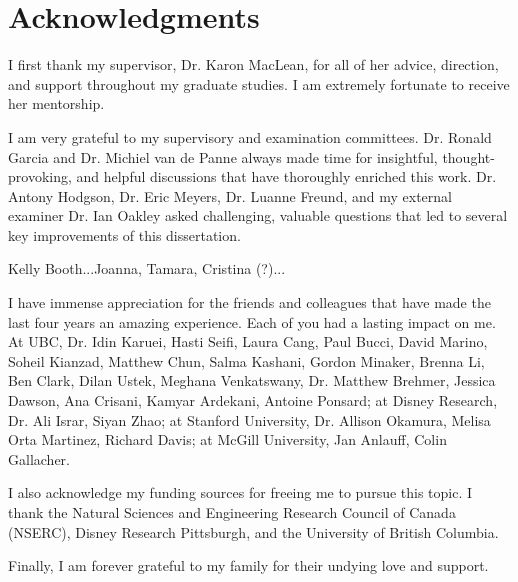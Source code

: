 
\chapter{Acknowledgments}

I first thank my supervisor, Dr. Karon MacLean, for all of her advice, direction, and support throughout my graduate studies.
I am extremely fortunate to receive her mentorship.

I am very grateful to my supervisory and examination committees. Dr. Ronald Garcia and Dr. Michiel van de Panne always made time for insightful, thought-provoking, and helpful discussions that have thoroughly enriched this work.
Dr. Antony Hodgson, Dr. Eric Meyers, Dr. Luanne Freund, and my external examiner Dr. Ian Oakley asked challenging, valuable questions that led to several key improvements of this dissertation.

Kelly Booth...Joanna, Tamara, Cristina (?)...

I have immense appreciation for the friends and colleagues that have made the last four years an amazing experience.
Each of you had a lasting impact on me.
At UBC, Dr. Idin Karuei, Hasti Seifi, Laura Cang, Paul Bucci,  David Marino, Soheil Kianzad, Matthew Chun, Salma Kashani, Gordon Minaker, Brenna Li,  Ben Clark, Dilan Ustek, Meghana Venkatswany, Dr. Matthew Brehmer, Jessica Dawson, Ana Crisani, Kamyar Ardekani, Antoine Ponsard;
at Disney Research, Dr. Ali Israr, Siyan Zhao; 
at Stanford University, Dr. Allison Okamura, Melisa Orta Martinez, Richard Davis;
at McGill University, Jan Anlauff, Colin Gallacher.

I also acknowledge my funding sources for freeing me to pursue this topic.
I thank the Natural Sciences and Engineering Research Council of Canada (NSERC), Disney Research Pittsburgh, and the University of British Columbia.

Finally, I am forever grateful to my family for their undying love and support.